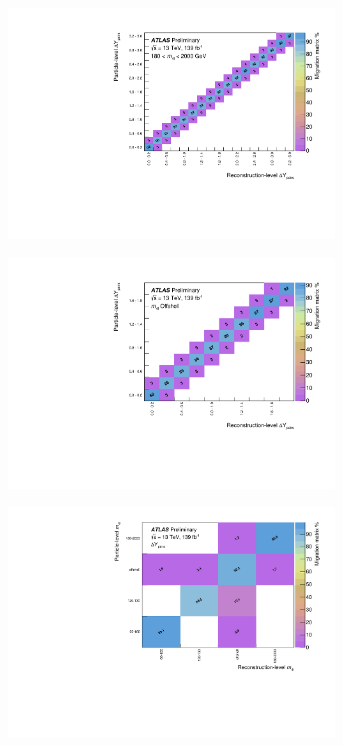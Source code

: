 \begin{figure}[htb]
    \begin{subfigure}{.49\textwidth}\centering\includegraphics[width = 0.95\textwidth]{Figures/m4l/UnfoldingStudies/v014_matrices/deltaYPairs_m4l180-2000Matrix.pdf}\end{subfigure}
    \begin{subfigure}{.49\textwidth}\centering\includegraphics[width = 0.95\textwidth]{Figures/m4l/UnfoldingStudies/v014_matrices/deltaYPairs_m4loffshellMatrix.pdf}\end{subfigure}
    \begin{subfigure}{.49\textwidth}\centering\includegraphics[width = 0.95\textwidth]{Figures/m4l/UnfoldingStudies/v014_matrices/deltaYPairs_m4lMatrix.pdf}\end{subfigure}

\end{figure}
